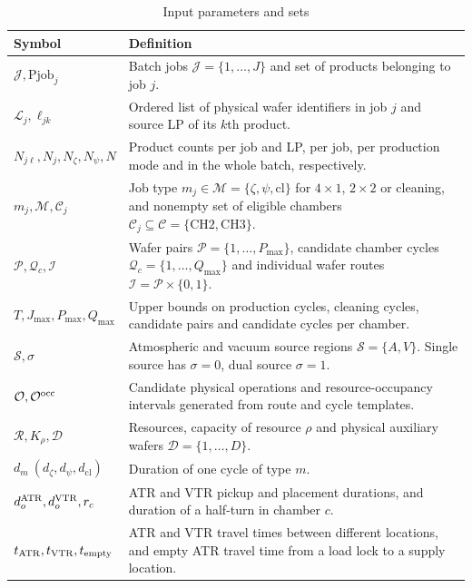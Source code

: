 \documentclass[preprint,12pt,nonatbib]{elsarticle}
\begin{document}
\begin{table}[!htbp]
\centering\small
\caption{Input parameters and sets}
\label{tab:symbol-cn-a}
\renewcommand{\arraystretch}{1.03}
\setlength{\tabcolsep}{4pt}
\begin{tabular}{@{}C{0.20\textwidth}C{\textwidth-8pt\relax}@{}}
\toprule
Symbol & Definition\\\midrule
$\mathcal J,\mathrm{Pjob}_j$ & Batch jobs $\mathcal J=\{1,\ldots,J\}$ and set of products belonging to job $j$.\\
$\mathcal L_j,\ell_{jk}$ & Ordered list of physical wafer identifiers in job $j$ and source LP of its $k$th product.\\
$N_{j\ell},N_j,N_\zeta,N_\psi,N$ & Product counts per job and LP, per job, per production mode and in the whole batch, respectively.\\
$m_j,\mathcal M,\mathcal C_j$ & Job type $m_j\in\mathcal M=\{\zeta,\psi,\mathrm{cl}\}$ for $4\times1$, $2\times2$ or cleaning, and nonempty set of eligible chambers $\mathcal C_j\subseteq\mathcal C=\{\mathrm{CH2},\mathrm{CH3}\}$.\\
$\mathcal P,\mathcal Q_c,\mathcal I$ & Wafer pairs $\mathcal P=\{1,\ldots,P_{\max}\}$, candidate chamber cycles $\mathcal Q_c=\{1,\ldots,Q_{\max}\}$ and individual wafer routes $\mathcal I=\mathcal P\times\{0,1\}$.\\
$T,J_{\max},P_{\max},Q_{\max}$ & Upper bounds on production cycles, cleaning cycles, candidate pairs and candidate cycles per chamber.\\
$\mathcal S,\sigma$ & Atmospheric and vacuum source regions $\mathcal S=\{A,V\}$. Single source has $\sigma=0$, dual source $\sigma=1$.\\
$\mathcal O,\mathcal O^{\rm occ}$ & Candidate physical operations and resource-occupancy intervals generated from route and cycle templates.\\
$\mathcal R,K_\rho,\mathcal D$ & Resources, capacity of resource $\rho$ and physical auxiliary wafers $\mathcal D=\{1,\ldots,D\}$.\\
$d_m\ (d_\zeta,d_\psi,d_{\mathrm{cl}})$ & Duration of one cycle of type $m$.\\
$d_o^{\rm ATR},d_o^{\rm VTR},r_c$ & ATR and VTR pickup and placement durations, and duration of a half-turn in chamber $c$.\\
$t_{\rm ATR},t_{\rm VTR},t_{\rm empty}$ & ATR and VTR travel times between different locations, and empty ATR travel time from a load lock to a supply location.\\

\end{tabular}
\end{table}
\end{document}
